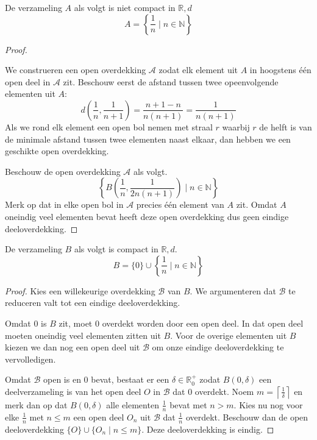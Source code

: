 \documentclass[main.tex]{subfiles}
\begin{document}
\begin{vb}
  De verzameling $A$ als volgt is niet compact in $\mathbb{R},d$
  \[ A = \left\{ \frac{1}{n} \mid n\in \mathbb{N} \right\} \]

    \begin{proof}
      \noindent
      \begin{klad}
        We construeren een open overdekking $\mathcal{A}$ zodat elk element uit $A$ in hoogstens \'e\'en open deel in $\mathcal{A}$ zit.
        Beschouw eerst de afstand tussen twee opeenvolgende elementen uit $A$:
        \[ d\left(\frac{1}{n},\frac{1}{n+1}\right) = \frac{n+1 - n}{n(n+1)} = \frac{1}{n(n+1)} \]
        Als we rond elk element een open bol nemen met straal $r$ waarbij $r$ de helft is van de minimale afstand tussen twee elementen naast elkaar, dan hebben we een geschikte open overdekking.
      \end{klad}
      Beschouw de open overdekking $\mathcal{A}$ als volgt.
      \[ \left\{ B\left(\frac{1}{n},\frac{1}{2n(n+1)}\right) \mid n\in \mathbb{N} \right\} \]
      Merk op dat in elke open bol in $\mathcal{A}$ precies \'e\'en element van $A$ zit.
      Omdat $A$ oneindig veel elementen bevat heeft deze open overdekking dus geen eindige deeloverdekking.
    \end{proof}
\end{vb}

\begin{vb}
  De verzameling $B$ als volgt is compact in $\mathbb{R},d$.
  \[ B = \{0\} \cup \left\{ \frac{1}{n} \mid n\in \mathbb{N} \right\} \]

  \begin{proof}
    Kies een willekeurige overdekking $\mathcal{B}$ van $B$.
    We argumenteren dat $\mathcal{B}$ te reduceren valt tot een eindige deeloverdekking.
    \begin{klad}
      Omdat $0$ is $B$ zit, moet $0$ overdekt worden door een open deel.
      In dat open deel moeten oneindig veel elementen zitten uit $B$.
      Voor de overige elementen uit $B$ kiezen we dan nog een open deel uit $\mathcal{B}$ om onze eindige deeloverdekking te vervolledigen.
    \end{klad}
    Omdat $\mathcal{B}$ open is en $0$ bevat, bestaat er een $\delta \in \mathbb{R}_{0}^{+}$ zodat $B(0,\delta)$ een deelverzameling is van het open deel $O$ in $\mathcal{B}$ dat $0$ overdekt.
    Noem $m=\left\lceil\frac{1}{\delta}\right\rceil$ en merk dan op dat $B(0,\delta)$ alle elementen $\frac{1}{n}$ bevat met $n > m$.
    Kies nu nog voor elke $\frac{1}{n}$ met $n \le m$ een open deel $O_{n}$ uit $\mathcal{B}$ dat $\frac{1}{n}$ overdekt.
    Beschouw dan de open deeloverdekking $\{ O \} \cup \{ O_{n} \mid n \le m \}$.
    Deze deeloverdekking is eindig.
  \end{proof}
\end{vb}
\end{document}
